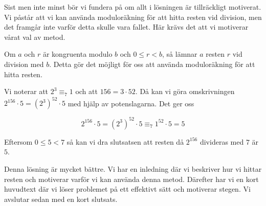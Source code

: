 \documentclass[titlepage]{article}
\begin{document}
Sist men inte minst bör vi fundera på om allt i lösningen är tillräckligt motiverat. Vi påstår att vi kan använda moduloräkning för att hitta resten vid division, men det framgår inte varför detta skulle vara fallet. Här krävs det att vi motiverar vårat val av metod.

\begin{center}
    \begin{tcolorbox}[width=\linewidth,colback={green!25!white},title={\textbf{Lösning 3 - Bättre}},outer arc=0mm,colupper=black]
        Om $a$ och $r$ är kongruenta modulo $b$ och $0\leq r<b$, så lämnar $a$ resten $r$ vid division med $b$. Detta gör det möjligt för oss att använda moduloräkning för att hitta resten. \vspace{2mm}

        Vi noterar att $2^3 \equiv_7 1$ och att $156 = 3\cdot 52$. Då kan vi göra omskrivningen $2^{156}\cdot 5 = (2^3)^{52} \cdot 5$ med hjälp av potenslagarna. Det ger oss

        $$2^{156}\cdot 5 = (2^3)^{52} \cdot 5 \equiv_7 1^{52} \cdot 5 = 5$$

        Eftersom $0\leq 5<7$ så kan vi dra slutsatsen att resten då $2^{156}$ divideras med $7$ är $5$.
    \end{tcolorbox} 
    \end{center}

Denna lösning är mycket bättre. Vi har en inledning där vi beskriver hur vi hittar resten och motiverar varför vi kan använda denna metod. Därefter har vi en kort huvudtext där vi löser problemet på ett effektivt sätt och motiverar stegen. Vi avslutar sedan med en kort slutsats.


\end{document}
